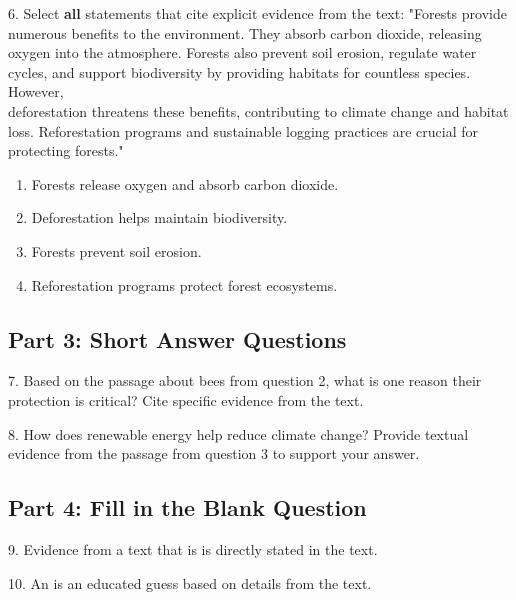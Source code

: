 \documentclass[12pt]{article}
\begin{document}
6. Select \textbf{all} statements that cite explicit evidence from the text:  
"Forests provide numerous benefits to the environment. They absorb carbon dioxide, releasing oxygen into the atmosphere. Forests also prevent soil erosion, regulate water cycles, and support biodiversity by providing habitats for countless species. However, \\deforestation threatens these benefits, contributing to climate change and habitat loss. Reforestation programs and sustainable logging practices are crucial for \\protecting forests."  
\begin{enumerate}[label=\Alph*.]
    \item Forests release oxygen and absorb carbon dioxide.  
    \item Deforestation helps maintain biodiversity.  
    \item Forests prevent soil erosion.  
    \item Reforestation programs protect forest ecosystems.  
\end{enumerate}

\vspace{1cm}
\newpage
\subsection*{Part 3: Short Answer Questions}

7. Based on the passage about bees from question 2, what is one reason their protection is critical? Cite specific evidence from the text.  
\vspace{4cm}

8. How does renewable energy help reduce climate change? Provide textual evidence from the passage from question 3 to support your answer.  
\vspace{4cm}

\subsection*{Part 4: Fill in the Blank Question}
\vspace{1cm}
9. Evidence from a text that is \underline{\hspace{4cm}} is directly stated in the text.
\vspace{2cm}

10. An  \underline{\hspace{4cm}} is an educated guess based on details from the text.
\end{document}
